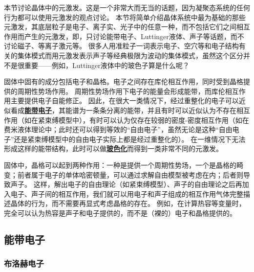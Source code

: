 \documentclass[hyperref, UTF8, a4paper]{ctexart}
\newcommand*{\concept}[1]{\underline{\textbf{#1}}}
\begin{document}
本节讨论晶体中的元激发。这是一个非常大而无当的话题，因为凝聚态系统的任何行为都可以使用元激发的观点讨论。
本节将简单介绍晶体系统中最为基础的那些元激发，其底层粒子是电子、离子实、光子中的任意一种，而不包括它们之间相互作用而产生的元激发，即，只讨论能带电子、Luttinger液体、声子等话题，而不讨论磁子、等离子激元等。
很多人用准粒子一词表示电子、空穴等和电子结构有关的集体模式而用元激发表示声子等经典极限为波动的集体模式，虽然这个区分并不是很重要——例如，Luttinger液体中的玻色子算是什么呢？

固体中固有的成分包括电子和晶格。电子之间存在库伦相互作用，同时受到晶格提供的周期性势场作用。
周期性势场作用下电子的能量会形成能带，而库伦相互作用主要提供电子自能修正。
因此，在很大一类情况下，经过重整化的电子可以近似看成\concept{能带电子}，其能谱为一条条分离的能带，并且有时可以近似认为不存在相互作用（如在紧束缚模型中），有时可以认为仅存在较弱的密度-密度相互作用（如在费米液体理论中；此时还可以得到等效的“自由电子”，虽然无论是这种“自由电子”还是紧束缚模型中的自由电子实际上都是经过重整化的）。
在一维情况下无法形成这样的能带结构，此时可以做\concept{玻色化}而得到一类非常不同的元激发。

固体中，晶格可以起到两种作用：一种是提供一个周期性势场，一个是晶格的畸变；前者属于电子的单体哈密顿量，可以通过求解自由模型被考虑在内；后者则导致声子。
这样，解出电子的自由理论（如紧束缚模型）、声子的自由理论之后再加入电子、声子间的相互作用，我们就可以用电子和声子组成的相互作用气体完整描述晶体的行为，而不需要再显式考虑晶格的存在。
例如，在计算热容等变量时，完全可以认为热容是声子和电子提供的，而不是（裸的）电子和晶格提供的。

\subsection{能带电子}\label{sec:energy-band}

\subsubsection{布洛赫电子}
\end{document}
